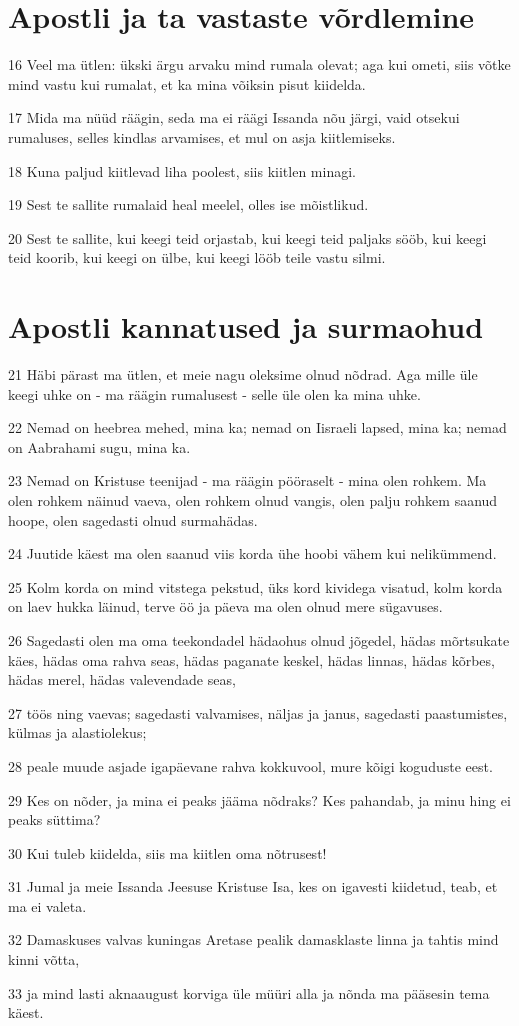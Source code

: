 \section*{Apostli ja ta vastaste võrdlemine}

\par 16 Veel ma ütlen: ükski ärgu arvaku mind rumala olevat; aga kui ometi, siis võtke mind vastu kui rumalat, et ka mina võiksin pisut kiidelda.
\par 17 Mida ma nüüd räägin, seda ma ei räägi Issanda nõu järgi, vaid otsekui rumaluses, selles kindlas arvamises, et mul on asja kiitlemiseks.
\par 18 Kuna paljud kiitlevad liha poolest, siis kiitlen minagi.
\par 19 Sest te sallite rumalaid heal meelel, olles ise mõistlikud.
\par 20 Sest te sallite, kui keegi teid orjastab, kui keegi teid paljaks sööb, kui keegi teid koorib, kui keegi on ülbe, kui keegi lööb teile vastu silmi.

\section*{Apostli kannatused ja surmaohud}

\par 21 Häbi pärast ma ütlen, et meie nagu oleksime olnud nõdrad. Aga mille üle keegi uhke on - ma räägin rumalusest - selle üle olen ka mina uhke.
\par 22 Nemad on heebrea mehed, mina ka; nemad on Iisraeli lapsed, mina ka; nemad on Aabrahami sugu, mina ka.
\par 23 Nemad on Kristuse teenijad - ma räägin pööraselt - mina olen rohkem. Ma olen rohkem näinud vaeva, olen rohkem olnud vangis, olen palju rohkem saanud hoope, olen sagedasti olnud surmahädas.
\par 24 Juutide käest ma olen saanud viis korda ühe hoobi vähem kui nelikümmend.
\par 25 Kolm korda on mind vitstega pekstud, üks kord kividega visatud, kolm korda on laev hukka läinud, terve öö ja päeva ma olen olnud mere sügavuses.
\par 26 Sagedasti olen ma oma teekondadel hädaohus olnud jõgedel, hädas mõrtsukate käes, hädas oma rahva seas, hädas paganate keskel, hädas linnas, hädas kõrbes, hädas merel, hädas valevendade seas,
\par 27 töös ning vaevas; sagedasti valvamises, näljas ja janus, sagedasti paastumistes, külmas ja alastiolekus;
\par 28 peale muude asjade igapäevane rahva kokkuvool, mure kõigi koguduste eest.
\par 29 Kes on nõder, ja mina ei peaks jääma nõdraks? Kes pahandab, ja minu hing ei peaks süttima?
\par 30 Kui tuleb kiidelda, siis ma kiitlen oma nõtrusest!
\par 31 Jumal ja meie Issanda Jeesuse Kristuse Isa, kes on igavesti kiidetud, teab, et ma ei valeta.
\par 32 Damaskuses valvas kuningas Aretase pealik damasklaste linna ja tahtis mind kinni võtta,
\par 33 ja mind lasti aknaaugust korviga üle müüri alla ja nõnda ma pääsesin tema käest.


